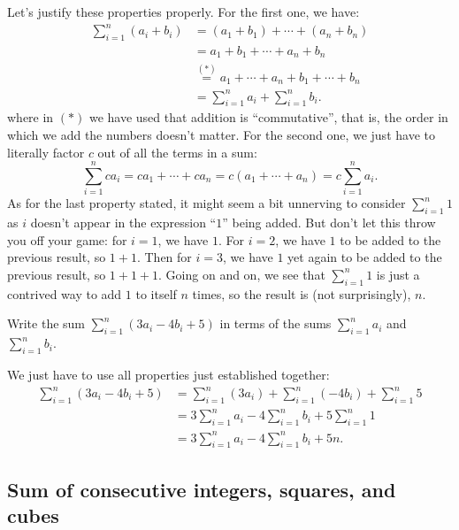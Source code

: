 \documentclass[nooutcomes]{ximera}
\begin{document}
Let's justify these properties properly. For the first one, we have:
\begin{align*}
  \sum_{i=1}^n(a_i+b_i) &= (a_1+b_1) + \cdots + (a_n+b_n) \\ &= a_1+b_1+\cdots + a_n+b_n \\ &\stackrel{(\ast)} = a_1+\cdots + a_n+b_1+\cdots + b_n \\ &= \sum_{i=1}^n a_i+\sum_{i=1}^nb_i.
\end{align*}where in $(\ast)$ we have used that addition is ``commutative'', that is, the order in which we add the numbers doesn't matter. For the second one, we just have to literally factor $c$ out of all the terms in a sum: $$\sum_{i=1}^n ca_i = ca_1+ \cdots + ca_n = c(a_1+\cdots+a_n)=c\sum_{i=1}^n a_i.$$As for the last property stated, it might seem a bit unnerving to consider $\sum_{i=1}^n 1$ as $i$ doesn't appear in the expression ``$1$'' being added. But don't let this throw you off your game: for $i=1$, we have $1$. For $i=2$, we have $1$ to be added to the previous result, so $1+1$. Then for $i=3$, we have $1$ yet again to be added to the previous result, so $1+1+1$. Going on and on, we see that $\sum_{i=1}^n1$ is just a contrived way to add $1$ to itself $n$ times, so the result is (not surprisingly), $n$.

\begin{example}
  Write the sum $\sum_{i=1}^n(3a_i-4b_i+5)$ in terms of the sums $\sum_{i=1}^na_i$ and $\sum_{i=1}^n b_i$.

  \begin{explanation}
    We just have to use all properties just established together:
    \begin{align*}
      \sum_{i=1}^n(3a_i-4b_i+5) &= \sum_{i=1}^n(3a_i) + \sum_{i=1}^n (-4b_i) + \sum_{i=1}^n 5 \\ &= 3\sum_{i=1}^n a_i - 4\sum_{i=1}^nb_i + 5\sum_{i=1}^n 1 \\ &= 3\sum_{i=1}^n a_i - 4\sum_{i=1}^nb_i + 5n.
    \end{align*}

  \end{explanation}
\end{example}

\subsection{Sum of consecutive integers, squares, and cubes}
\end{document}
